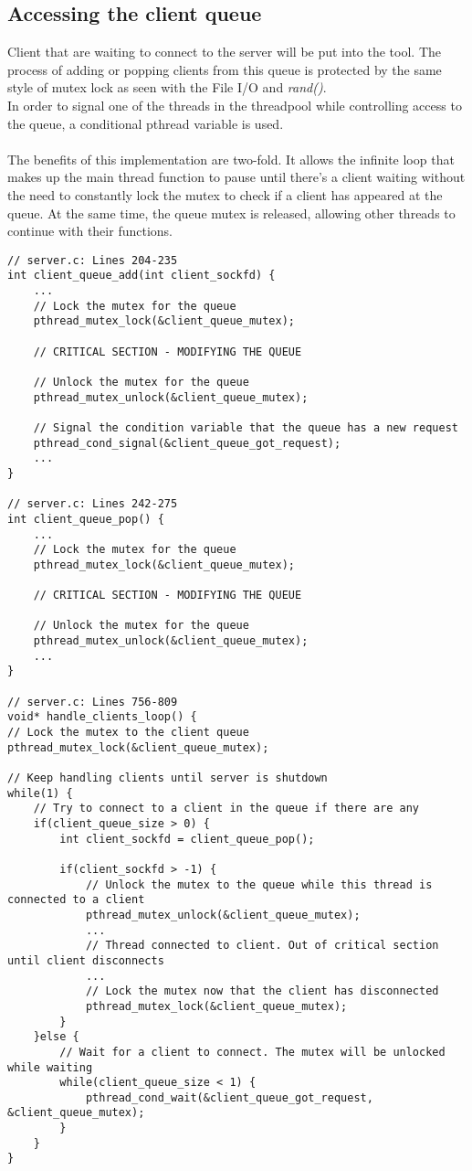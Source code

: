 \subsection{Accessing the client queue}
Client that are waiting to connect to the server will be put into the tool. The process of adding or popping clients from this queue is protected by the same style of mutex lock as seen with the File I/O and \textit{rand()}.
\\
In order to signal one of the threads in the threadpool while controlling access to the queue, a conditional pthread variable is used.
\\
\\
The benefits of this implementation are two-fold. It allows the infinite loop that makes up the main thread function to pause until there's a client waiting without the need to constantly lock the mutex to check if a client has appeared at the queue. At the same time, the queue mutex is released, allowing other threads to continue with their functions. 
\begin{lstlisting}[style=CStyle]
// server.c: Lines 204-235
int client_queue_add(int client_sockfd) {
	...
	// Lock the mutex for the queue
	pthread_mutex_lock(&client_queue_mutex);
	
	// CRITICAL SECTION - MODIFYING THE QUEUE
	
	// Unlock the mutex for the queue
	pthread_mutex_unlock(&client_queue_mutex);
	
	// Signal the condition variable that the queue has a new request
	pthread_cond_signal(&client_queue_got_request);
	...
}

// server.c: Lines 242-275
int client_queue_pop() {
	...
	// Lock the mutex for the queue
	pthread_mutex_lock(&client_queue_mutex);
	
	// CRITICAL SECTION - MODIFYING THE QUEUE
	
	// Unlock the mutex for the queue
	pthread_mutex_unlock(&client_queue_mutex);
	...
}

// server.c: Lines 756-809
void* handle_clients_loop() {
// Lock the mutex to the client queue
pthread_mutex_lock(&client_queue_mutex);

// Keep handling clients until server is shutdown
while(1) {
	// Try to connect to a client in the queue if there are any
	if(client_queue_size > 0) {
		int client_sockfd = client_queue_pop();
	
		if(client_sockfd > -1) {
			// Unlock the mutex to the queue while this thread is connected to a client
			pthread_mutex_unlock(&client_queue_mutex);
			...
			// Thread connected to client. Out of critical section until client disconnects
			...
			// Lock the mutex now that the client has disconnected
			pthread_mutex_lock(&client_queue_mutex);
		}
	}else {
		// Wait for a client to connect. The mutex will be unlocked while waiting
		while(client_queue_size < 1) {
			pthread_cond_wait(&client_queue_got_request, &client_queue_mutex);
		}
	}
}
\end{lstlisting}

